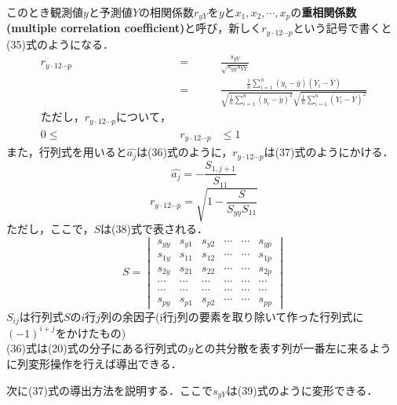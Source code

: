 \documentclass[dvipdfmx]{jsarticle}
\begin{document}
このとき観測値$y$と予測値$Y$の相関係数$r_{yY}$を$y$と$x_1,x_2,\cdots,x_p$の\textbf{重相関係数(multiple correlation coefficient)}と呼び，新しく$r_{y\cdot12\cdots p}$という記号で書くと(35)式のようになる．
\begin{eqnarray}
  r_{y\cdot12\cdots p}&=&\frac{s_{yY}}{\sqrt{s_{yy}s_{YY}}} \nonumber \\
  &=&\frac{\frac{1}{n}\displaystyle \sum_{i=1}^n(y_i-\bar{y})(Y_i-\bar{Y})}{\sqrt{\frac{1}{n}\displaystyle \sum_{i=1}^n (y_i-\bar{y})^2}\sqrt{\frac{1}{n}\displaystyle \sum_{i=1}^n (Y_i-\bar{Y})^2}} \\
  ただし，r_{y\cdot12\cdots p}について，　\nonumber　\\
  0 \leq &r_{y\cdot12\cdots p}& \leq 1 \nonumber
\end{eqnarray}
また，行列式を用いると$\hat{a_j}$は(36)式のように，$r_{y\cdot12\cdots p}$は(37)式のようにかける．
\begin{equation}
  \hat{a_j}=-\frac{S_{1,j+1}}{S_{11}}
\end{equation}
\begin{equation}
  r_{y\cdot12\cdots p} = \sqrt{1-\frac{S}{S_{yy}S_{11}}}
\end{equation}
ただし，ここで，$S$は(38)式で表される．
\begin{equation}
  S=
  \begin{vmatrix}
    s_{yy} & s_{y1} & s_{y2} & \cdots & \cdots & s_{yp} \\
    s_{1y} & s_{11} & s_{12} & \cdots & \cdots & s_{1p} \\
    s_{2y} & s_{21} & s_{22} & \cdots & \cdots & s_{2p} \\
    \cdots & \cdots & \cdots & \cdots & \cdots & \cdots \\
    \cdots & \cdots & \cdots & \cdots & \cdots & \cdots \\
    s_{py} & s_{p1} & s_{p2} & \cdots & \cdots & s_{pp}
  \end{vmatrix}
\end{equation}
$S_{ij}$は行列式$S$の$i$行$j$列の余因子(i行j列の要素を取り除いて作った行列式に$(-1)^{i+j}$をかけたもの)
\\
(36)式は(20)式の分子にある行列式の$y$との共分散を表す列が一番左に来るように列変形操作を行えば導出できる．
\par
次に(37)式の導出方法を説明する．ここで$s_{yY}$は(39)式のように変形できる．
\end{document}
